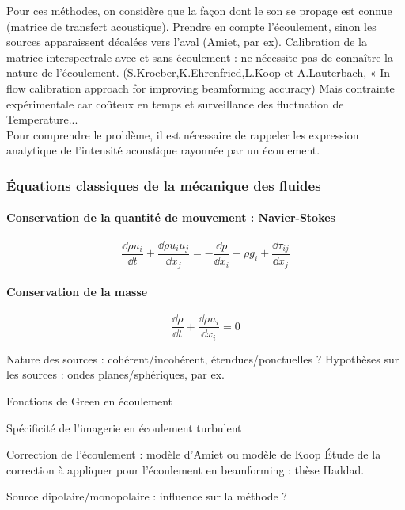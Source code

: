 Pour ces méthodes, on considère que la façon dont le son se propage est connue (matrice de transfert acoustique). Prendre en compte l'écoulement, sinon les sources apparaissent décalées vers l'aval (Amiet, par ex). 
Calibration de la matrice interspectrale avec et sans écoulement : ne nécessite pas de connaître la nature de l'écoulement. (S.Kroeber,K.Ehrenfried,L.Koop et A.Lauterbach, « In-flow calibration approach for improving beamforming accuracy) Mais contrainte expérimentale car coûteux en temps et surveillance des fluctuation de Temperature...\\


Pour comprendre le problème, il est nécessaire de rappeler les expression analytique de l'intensité acoustique rayonnée par un écoulement.

\subsubsection{Équations classiques de la mécanique des fluides}
\paragraph{Conservation de la quantité de mouvement : Navier-Stokes}
\begin{equation}
	\frac{\dd \rho u_i}{\dd t} + \frac{\dd \rho u_i u_j}{\dd x_j} = -\frac{\dd p}{\dd x_i} + \rho g_i + \frac{\dd \tau_{ij}}{\dd x_j}
\end{equation}
\paragraph{Conservation de la masse}
\begin{equation}
 \frac{\dd \rho}{\dd t} + \frac{\dd \rho u_{i}}{\dd x_i} = 0
\end{equation}




Nature des sources : cohérent/incohérent, étendues/ponctuelles ? Hypothèses sur les sources : ondes planes/sphériques, par ex.

Fonctions de Green en écoulement

Spécificité de l'imagerie en écoulement turbulent

Correction de l'écoulement : modèle d'Amiet ou modèle de Koop
Étude de la correction à appliquer pour l'écoulement en beamforming : thèse Haddad.


Source dipolaire/monopolaire : influence sur la méthode ?

